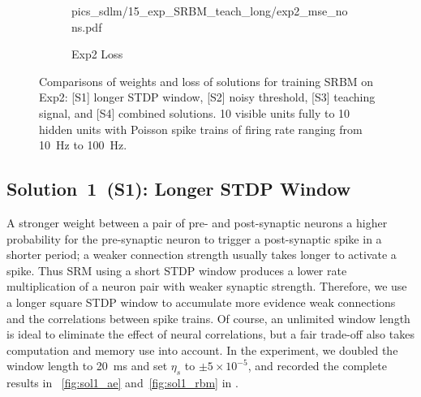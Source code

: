 \begin{figure}
\begin{subfigure}[c]{0.48\textwidth}
{			{pics_sdlm/15_exp_SRBM_teach_long/exp2_mse_nons.pdf}}\\
		\caption{Exp2 Loss}
	\end{subfigure}%
	\caption{Comparisons of weights and loss of solutions for training SRBM on Exp2: [S1] longer STDP window, [S2] noisy threshold, [S3] teaching signal, and [S4] combined solutions. 10 visible units fully \DIFdelbeginFL {}\DIFdelendFL \DIFaddbeginFL {}\DIFaddendFL to 10 hidden units with Poisson spike trains of firing rate ranging from 10~Hz to 100~Hz.}
	\label{fig:sols_rbm}
\end{figure}

\subsection{Solution~1~(S1): Longer STDP Window}
A stronger weight between a pair of pre- and post-synaptic neurons \DIFdelbegin {}\DIFdelend \DIFaddbegin {}\DIFaddend a higher probability for the pre-synaptic neuron to trigger a post-synaptic spike in a shorter period; 
a weaker connection strength usually takes longer to activate a spike.
Thus SRM using a short STDP window produces a lower rate multiplication of a neuron pair with weaker synaptic strength.
Therefore, we use a longer square STDP window to accumulate more evidence \DIFdelbegin {}\DIFdelend \DIFaddbegin {}\DIFaddend weak connections and \DIFdelbegin {}\DIFdelend \DIFaddbegin {}\DIFaddend the correlations between spike trains.
Of course, an unlimited window length is ideal to eliminate the effect of neural correlations, but a fair trade-off also takes computation and memory use into account.
In the experiment, we doubled the window length to 20~ms and set $\eta_s$ to $\pm 5 \times 10^{-5}$, and recorded the complete results in \DIFdelbegin {}\DIFdelend \DIFaddbegin {}\DIFaddend ~\ref{fig:sol1_ae} and~\ref{fig:sol1_rbm} in \DIFdelbegin {}\DIFdelend \DIFaddbegin {}\DIFaddend .

